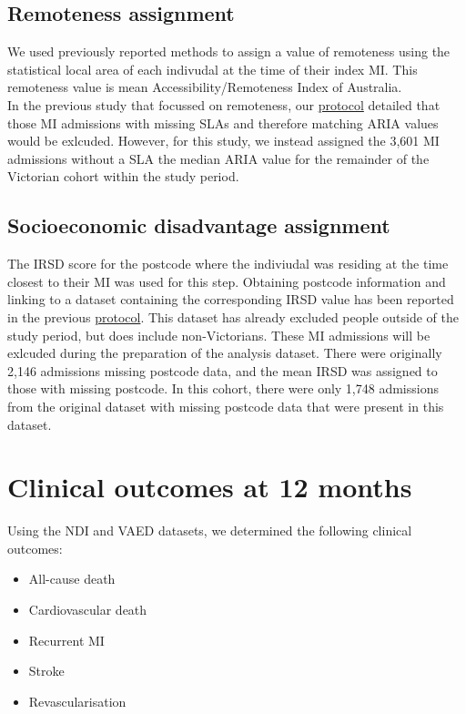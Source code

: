 \documentclass[11pt]{article}
\begin{document}
\subsection{Remoteness assignment}
We used previously reported methods to assign a value of remoteness using the statistical local area of each indivudal at the time of their index MI. This remoteness value is mean Accessibility/Remoteness Index of Australia.\cite{aihwrural} \\
In the previous study that focussed on remoteness, our \color{blue} \href{https://github.com/cardiopharmnerd/medsremote}{protocol} \color{black} detailed that those MI admissions with missing SLAs and therefore matching ARIA values would be exlcuded. However, for this study, we instead assigned the 3,601 MI admissions without a SLA the median ARIA value for the remainder of the Victorian cohort within the study period. 
\color{violet}
\begin{stlog}\end{stlog}
\color{black}
\pagebreak
\subsection{Socioeconomic disadvantage assignment}
The IRSD score for the postcode where the indiviudal was residing at the time closest to their MI was used for this step. Obtaining postcode information and linking to a dataset containing the corresponding IRSD value has been reported in the previous \color{blue} \href{https://github.com/cardiopharmnerd/medsremote}{protocol}. \color{black} This dataset has already excluded people outside of the study period, but does include non-Victorians. These MI admissions will be exlcuded during the preparation of the analysis dataset. There were originally 2,146 admissions missing postcode data, and the mean IRSD was assigned to those with missing postcode. In this cohort, there were only 1,748 admissions from the original dataset with missing postcode data that were present in this dataset. 
\color{violet}
\begin{stlog}\end{stlog}
\color{black}
\pagebreak
\section{Clinical outcomes at 12 months}
Using the NDI and VAED datasets, we determined the following clinical outcomes:
\begin{itemize}
\item All-cause death 
\item Cardiovascular death
\item Recurrent MI
\item Stroke
\item Revascularisation
\end{itemize}
\color{violet}
\end{document}
